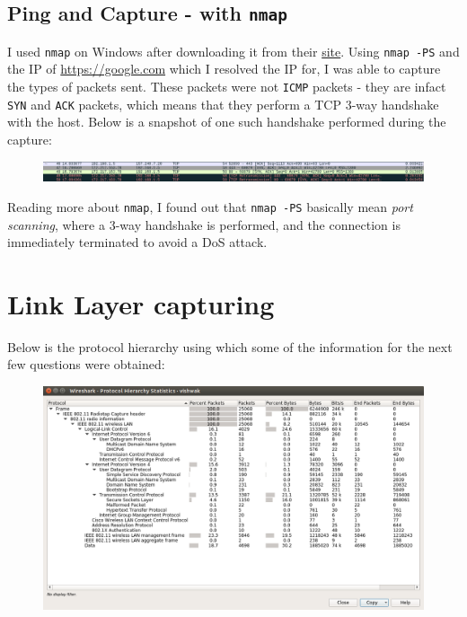 \documentclass{article}
\begin{document}
\subsection{Ping and Capture - with \texttt{nmap}}
\begin{flushleft}
I used \texttt{nmap} on Windows after downloading it from their \href{http://nmap.org}{site}. Using \texttt{nmap -PS} and the IP of \url{https://google.com} which I resolved the IP for, I was able to capture the types of packets sent. These packets were not \texttt{ICMP} packets - they are infact \texttt{SYN} and \texttt{ACK} packets, which means that they perform a TCP 3-way handshake with the host. Below is a snapshot of one such handshake performed during the capture:
\begin{figure}[H]
\centering
\includegraphics[width=\linewidth]{nmap-snapshot.png}
\end{figure}

Reading more about \texttt{nmap}, I found out that \texttt{nmap -PS} basically mean \emph{port scanning}, where a 3-way handshake is performed, and the connection is immediately terminated to avoid a DoS attack.
\end{flushleft}
\newpage

\section{Link Layer capturing}
\begin{flushleft}
Below is the protocol hierarchy using which some of the information for the next few questions were obtained:
\begin{figure}[H]
\centering
\includegraphics[width=0.7\linewidth]{protocol-hierarchy.png}
\end{figure}
\end{flushleft}
\end{document}

